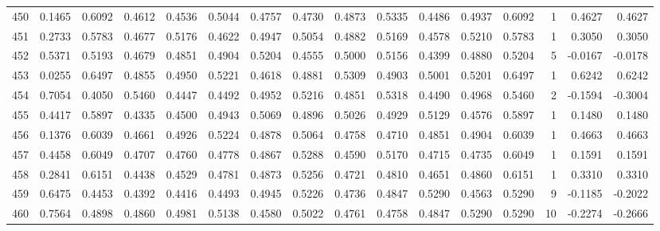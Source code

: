 \begin{tabular}{lrrrrrrrrrrrrrrr}
450 &      0.1465 &  0.6092 &  0.4612 &  0.4536 &  0.5044 &  0.4757 &  0.4730 &  0.4873 &  0.5335 &  0.4486 &   0.4937 &     0.6092 &      1 &                    0.4627 &                     0.4627 \\
451 &      0.2733 &  0.5783 &  0.4677 &  0.5176 &  0.4622 &  0.4947 &  0.5054 &  0.4882 &  0.5169 &  0.4578 &   0.5210 &     0.5783 &      1 &                    0.3050 &                     0.3050 \\
452 &      0.5371 &  0.5193 &  0.4679 &  0.4851 &  0.4904 &  0.5204 &  0.4555 &  0.5000 &  0.5156 &  0.4399 &   0.4880 &     0.5204 &      5 &                   -0.0167 &                    -0.0178 \\
453 &      0.0255 &  0.6497 &  0.4855 &  0.4950 &  0.5221 &  0.4618 &  0.4881 &  0.5309 &  0.4903 &  0.5001 &   0.5201 &     0.6497 &      1 &                    0.6242 &                     0.6242 \\
454 &      0.7054 &  0.4050 &  0.5460 &  0.4447 &  0.4492 &  0.4952 &  0.5216 &  0.4851 &  0.5318 &  0.4490 &   0.4968 &     0.5460 &      2 &                   -0.1594 &                    -0.3004 \\
455 &      0.4417 &  0.5897 &  0.4335 &  0.4500 &  0.4943 &  0.5069 &  0.4896 &  0.5026 &  0.4929 &  0.5129 &   0.4576 &     0.5897 &      1 &                    0.1480 &                     0.1480 \\
456 &      0.1376 &  0.6039 &  0.4661 &  0.4926 &  0.5224 &  0.4878 &  0.5064 &  0.4758 &  0.4710 &  0.4851 &   0.4904 &     0.6039 &      1 &                    0.4663 &                     0.4663 \\
457 &      0.4458 &  0.6049 &  0.4707 &  0.4760 &  0.4778 &  0.4867 &  0.5288 &  0.4590 &  0.5170 &  0.4715 &   0.4735 &     0.6049 &      1 &                    0.1591 &                     0.1591 \\
458 &      0.2841 &  0.6151 &  0.4438 &  0.4529 &  0.4781 &  0.4873 &  0.5256 &  0.4721 &  0.4810 &  0.4651 &   0.4860 &     0.6151 &      1 &                    0.3310 &                     0.3310 \\
459 &      0.6475 &  0.4453 &  0.4392 &  0.4416 &  0.4493 &  0.4945 &  0.5226 &  0.4736 &  0.4847 &  0.5290 &   0.4563 &     0.5290 &      9 &                   -0.1185 &                    -0.2022 \\
460 &      0.7564 &  0.4898 &  0.4860 &  0.4981 &  0.5138 &  0.4580 &  0.5022 &  0.4761 &  0.4758 &  0.4847 &   0.5290 &     0.5290 &     10 &                   -0.2274 &                    -0.2666 \\

\end{tabular}

